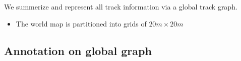 We summerize and represent all track information via a global track graph.
\begin{itemize}
	\item The world map is partitioned into grids of $20m\times20m$
\end{itemize}




\subsection{Annotation on global graph}



